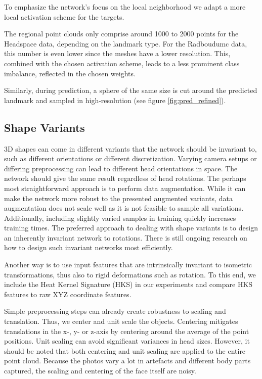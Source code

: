 \documentclass[class=article, crop=false]{standalone}
\begin{document}
To emphasize the network's focus on the local neighborhood we adapt a more local activation scheme for the targets.

The regional point clouds only comprise around 1000 to 2000 points for the Headspace data, depending on the landmark type. For the Radboudumc data, this number is even lower since the meshes have a lower resolution. This, combined with the chosen activation scheme, leads to a less prominent class imbalance, reflected in the chosen weights.

Similarly, during prediction, a sphere of the same size is cut around the predicted landmark and sampled in high-resolution (see figure \ref{fig:pred_refined}).


\subsection{Shape Variants}
3D shapes can come in different variants that the network should be invariant to, such as different orientations or different discretization. Varying camera setups or differing preprocessing can lead to different head orientations in space. The network should give the same result regardless of head rotations. The perhaps most straightforward approach is to perform data augmentation. While it can make the network more robust to the presented augmented variants, data augmentation does not scale well as it is not feasible to sample all variations. Additionally, including slightly varied samples in training quickly increases training times. The preferred approach to dealing with shape variants is to design an inherently invariant network to rotations. There is still ongoing research on how to design such invariant networks most efficiently. 

Another way is to use input features that are intrinsically invariant to isometric transformations, thus also to rigid deformations such as rotation. To this end, we include the Heat Kernel Signature (HKS) in our experiments and compare HKS features to raw XYZ coordinate features.

Simple preprocessing steps can already create robustness to scaling and translation. Thus, we center and unit scale the objects. Centering mitigates translations in the x-, y- or z-axis by centering around the average of the point positions. Unit scaling can avoid significant variances in head sizes. However, it should be noted that both centering and unit scaling are applied to the entire point cloud. Because the photos vary a lot in artefacts and different body parts captured, the scaling and centering of the face itself are noisy.
\end{document}
